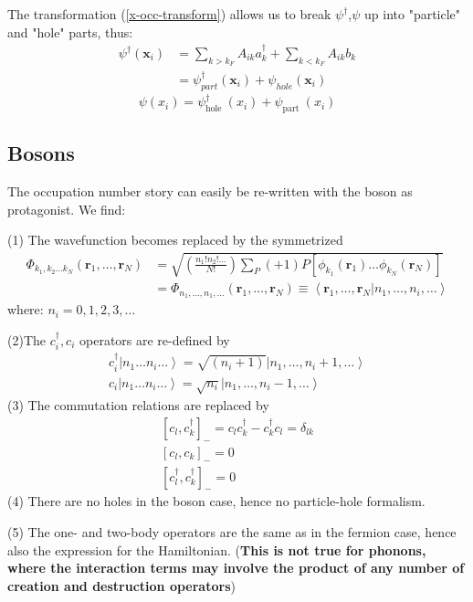 The transformation (\ref{x-occ-transform}) allows us to break $\psi^{\dagger}$,$\psi$ up into "particle" and "hole" parts, thus:
\begin{equation}\begin{aligned}
\psi^{\dagger}\left(\mathbf{x}_{i}\right) &=\sum_{k>k_{F}} A_{i k} a_{k}^{\dagger}+\sum_{k<k_{F}} A_{i k} b_{k} \\
&=\psi_{p a r t}^{\dagger}\left(\mathbf{x}_{i}\right)+\psi_{h o l e}\left(\mathbf{x}_{i}\right)
\end{aligned}\end{equation}
\begin{equation}\psi\left(x_{i}\right)=\psi_{\text {hole }}^{\dagger}\left(x_{i}\right)+\psi_{\text {part }}\left(x_{i}\right)\end{equation}

\subsection{Bosons}
The occupation number story can easily be re-written with the boson as protagonist. We find:

(1) The wavefunction becomes replaced by the symmetrized
\begin{equation}\begin{aligned}
\Phi_{k_{1}, k_{2} \ldots k_{N}}\left(\mathbf{r}_{1}, \ldots, \mathbf{r}_{N}\right) &=\sqrt{\left(\frac{n_{1} ! n_{2} ! \ldots}{N !}\right) \sum_{P}(+1) P\left[\phi_{k_{1}}\left(\mathbf{r}_{1}\right) \ldots \phi_{k_{N}}\left(\mathbf{r}_{N}\right)\right]} \\
&=\Phi_{n_{1}, \ldots, n_{1}, \ldots}\left(\mathbf{r}_{1}, \ldots, \mathbf{r}_{N}\right) \equiv\left\langle\mathbf{r}_{1}, \ldots, \mathbf{r}_{N} | n_{1}, \ldots, n_{i}, \ldots\right\rangle
\end{aligned}\end{equation}
where: $n_i=0,1,2,3,\ldots$

(2)The $c_{i}^{\dagger}, c_{i}$ operators are re-defined by
\begin{equation}\begin{array}{l}
c_{i}^{\dagger}\left|n_{1} \ldots n_{i} \ldots\right\rangle=\sqrt{( n_{i}+1)}\left|n_{1}, \ldots, n_{i}+1, \ldots\right\rangle \\
c_{i}\left|n_{1} \ldots n_{i} \ldots\right\rangle=\sqrt{n_{i}}\left|n_{1}, \ldots, n_{i}-1, \ldots\right\rangle
\end{array}\end{equation}
(3) The commutation relations are replaced by
\begin{equation}\begin{array}{l}
{\left[c_{l}, c_{k}^{\dagger}\right]_{-}=c_{l} c_{k}^{\dagger}-c_{k}^{\dagger} c_{l}=\delta_{l k}} \\
{\left[c_{l}, c_{k}\right]_{-}=0} \\
{\left[c_{l}^{\dagger}, c_{k}^{\dagger}\right]_{-}=0}
\end{array}\end{equation}
(4) There are no holes in the boson case, hence no particle-hole formalism.

(5) The one- and two-body operators are the same as in the fermion case, hence also the expression for the Hamiltonian. (\textbf{This is not true for phonons, where the interaction terms may involve the product of any number of creation and destruction operators})